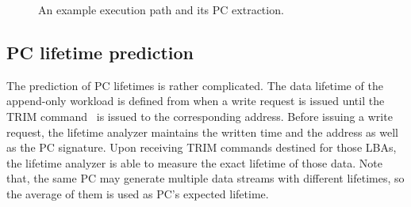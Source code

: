\begin{figure}[t]
	\centering
	\vspace{-10pt}
	\hfill
	\vspace{-8pt}
	\caption{An example execution path and its PC extraction.} %
	\label{fig:getpc}
	\vspace{-20pt}
\end{figure}


\vspace{-10pt}
\subsection{PC lifetime prediction}
The prediction of PC lifetimes is rather complicated. 
The data lifetime of the append-only workload is defined 
from when a write request is issued until the TRIM command~\cite{TRIM} is issued to 
the corresponding address.
Before issuing a write request, the lifetime analyzer
maintains the written time and the address as well as the PC signature.
Upon receiving TRIM
commands destined for those LBAs, the lifetime analyzer is able to measure the
exact lifetime of those data. 
Note that, the
same PC may generate multiple data streams with different lifetimes, 
so the average of them is used as PC's expected lifetime.


\vspace{-5pt}
